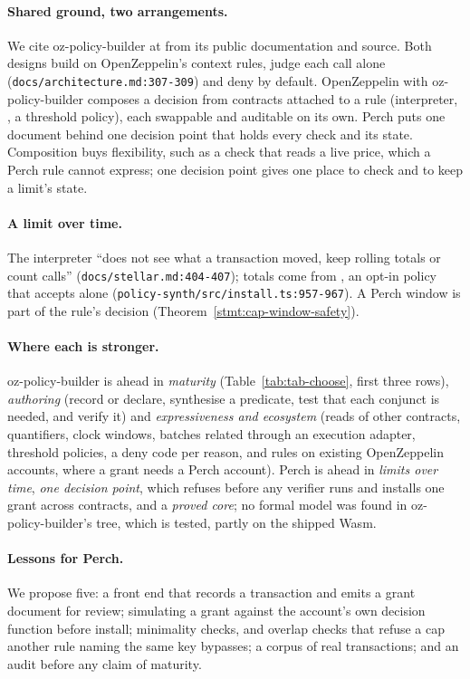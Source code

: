 \paragraph{Shared ground, two arrangements.} We cite oz-policy-builder at
 from its public documentation and source. Both designs build on OpenZeppelin's
context rules, judge each call alone (\nolinkurl{docs/architecture.md:307-309}) and
deny by default. OpenZeppelin with oz-policy-builder composes a decision from
contracts attached to a rule (interpreter, , a threshold
policy), each swappable and auditable on its own. Perch puts one document behind one decision
point that holds every check and its state.
Composition buys flexibility, such as a check that reads a live price, which a
Perch rule cannot express; one decision point gives one place to check and to
keep a limit's state.

\paragraph{A limit over time.} The interpreter ``does not see what a transaction
moved, keep rolling totals or count calls'' (\nolinkurl{docs/stellar.md:404-407});
totals come from , an opt-in policy that accepts
 alone (\nolinkurl{policy-synth/src/install.ts:957-967}). A
Perch window is part of the rule's decision (Theorem~\ref{stmt:cap-window-safety}).


\paragraph{Where each is stronger.} oz-policy-builder is ahead in
\emph{maturity} (Table~\ref{tab:tab-choose}, first three rows),
\emph{authoring} (record or declare, synthesise a predicate, test that each
conjunct is needed, and verify it) and \emph{expressiveness and ecosystem}
(reads of other contracts, quantifiers, clock windows, batches related through
an execution adapter, threshold policies, a deny code per reason, and rules on
existing OpenZeppelin accounts, where a grant needs a Perch account). Perch is
ahead in \emph{limits over time}, \emph{one decision point}, which refuses
before any verifier runs and installs one grant across contracts, and a
\emph{proved core}; no formal model was found in oz-policy-builder's tree,
which is tested, partly on the shipped Wasm.

\paragraph{Lessons for Perch.} We propose five: a front end that records a
transaction and emits a grant document for review; simulating a grant against
the account's own decision function before install; minimality checks, and
overlap checks that refuse a cap another rule naming the same key bypasses; a
corpus of real transactions; and an audit before any claim of maturity.
